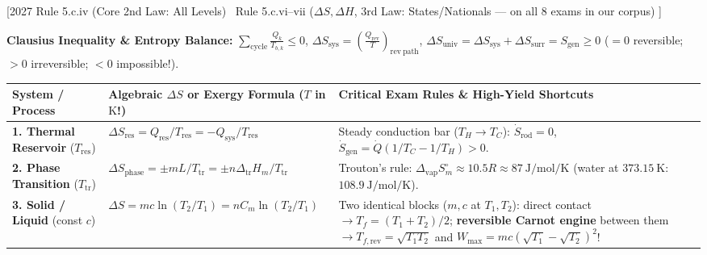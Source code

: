 \documentclass[10pt,twoside,openany,letterpaper]{book}
\begin{document}
\begin{quicksheet}\label{qr:08}
[2027 Rule 5.c.iv (Core 2nd Law: All Levels) \textbar\ Rule 5.c.vi--vii ($\Delta S, \Delta H$, 3rd Law: States/Nationals --- on all 8 exams in our corpus) ]

\begin{formulacard}
\scriptsize
\textbf{Clausius Inequality \& Entropy Balance:} $\displaystyle \sum_{\mathrm{cycle}}\frac{Q_k}{T_{b,k}} \le 0$, $\displaystyle \Delta S_{\mathrm{sys}} = \left(\frac{Q_{\mathrm{rev}}}{T}\right)_{\mathrm{rev\ path}}$, $\displaystyle \boxed{\Delta S_{\mathrm{univ}} = \Delta S_{\mathrm{sys}} + \Delta S_{\mathrm{surr}} = S_{\mathrm{gen}} \ge 0}$ ($=0$ reversible; $>0$ irreversible; $<0$ impossible!).
\par\smallskip\noindent
\scriptsize\setlength{\tabcolsep}{2.8pt}\renewcommand{\arraystretch}{1.14}
\begin{tabularx}{\linewidth}{@{}l l X@{}}
\toprule
\textbf{System / Process} & \textbf{Algebraic $\Delta S$ or Exergy Formula ($T$ in $\si{\kelvin}$!)} & \textbf{Critical Exam Rules \& High-Yield Shortcuts} \\
\midrule
\textbf{1. Thermal Reservoir} ($T_{\mathrm{res}}$) & $\Delta S_{\mathrm{res}} = Q_{\mathrm{res}}/T_{\mathrm{res}} = -Q_{\mathrm{sys}}/T_{\mathrm{res}}$ & Steady conduction bar ($T_H\to T_C$): $\dot{S}_{\mathrm{rod}}=0$, $\dot{S}_{\mathrm{gen}} = \dot{Q}(1/T_C - 1/T_H) > 0$. \\
\textbf{2. Phase Transition} ($T_{\mathrm{tr}}$) & $\Delta S_{\mathrm{phase}} = \pm mL/T_{\mathrm{tr}} = \pm n\Delta_{\mathrm{tr}}H_m/T_{\mathrm{tr}}$ & Trouton's rule: $\Delta_{\mathrm{vap}}S_m^\circ \approx 10.5R \approx \SI{87}{\joule\per\mole\per\kelvin}$ (water at $\SI{373.15}{\kelvin}$: $\SI{108.9}{\joule\per\mole\per\kelvin}$). \\
\textbf{3. Solid / Liquid} (const $c$) & $\Delta S = mc\ln(T_2/T_1) = nC_m\ln(T_2/T_1)$ & Two identical blocks ($m,c$ at $T_1, T_2$): direct contact $\to T_f = (T_1+T_2)/2$; \textbf{reversible Carnot engine} between them $\to \boxed{T_{f,\mathrm{rev}} = \sqrt{T_1T_2}}$ and $\boxed{W_{\max} = mc(\sqrt{T_1}-\sqrt{T_2})^2}$! \\

\end{tabularx}
\end{formulacard}
\end{quicksheet}
\end{document}
